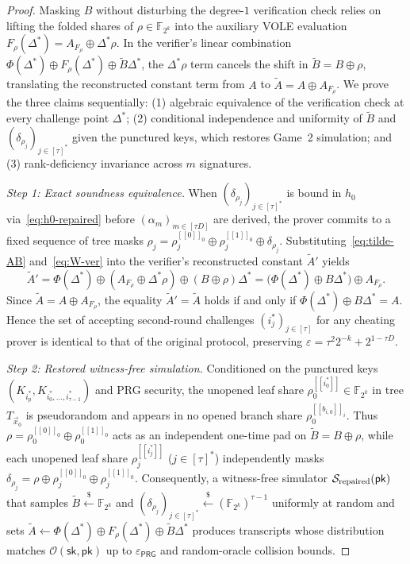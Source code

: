 \documentclass[11pt,a4paper]{article}
\theoremstyle{definition}
\theoremstyle{remark}
\newcommand{\Ftwok}{\mathbb{F}_{2^k}}
\newcommand{\pk}{\mathsf{pk}}
\newcommand{\sk}{\mathsf{sk}}
\newcommand{\PRG}{\mathsf{PRG}}
\newcommand{\share}[1]{[\![#1]\!]}
\begin{document}
\begin{proof}
Masking $B$ without disturbing the degree-$1$ verification check relies on lifting the folded shares of $\rho \in \Ftwok$ into the auxiliary VOLE evaluation $F_\rho(\Delta^*) = A_{F_\rho} \oplus \Delta^*\rho$. In the verifier's linear combination $\Phi(\Delta^*) \oplus F_\rho(\Delta^*) \oplus \tilde{B}\Delta^*$, the $\Delta^*\rho$ term cancels the shift in $\tilde{B} = B \oplus \rho$, translating the reconstructed constant term from $A$ to $\tilde{A} = A \oplus A_{F_\rho}$. We prove the three claims sequentially: (1) algebraic equivalence of the verification check at every challenge point $\Delta^*$; (2) conditional independence and uniformity of $\tilde{B}$ and $(\delta_{\rho_j})_{j \in [\tau]^*}$ given the punctured keys, which restores Game~2 simulation; and (3) rank-deficiency invariance across $m$ signatures.

\smallskip\noindent
\emph{Step 1: Exact soundness equivalence.}
When $(\delta_{\rho_j})_{j \in [\tau]^*}$ is bound in $h_0$ via~\eqref{eq:h0-repaired} before $(\alpha_m)_{m \in [\tau D]}$ are derived, the prover commits to a fixed sequence of tree masks $\rho_j = \rho_j^{\share{0}_0} \oplus \rho_j^{\share{1}_0} \oplus \delta_{\rho_j}$. Substituting~\eqref{eq:tilde-AB} and~\eqref{eq:W-ver} into the verifier's reconstructed constant $\tilde{A}'$ yields
\[
\tilde{A}' = \Phi(\Delta^*) \oplus (A_{F_\rho} \oplus \Delta^* \rho) \oplus (B \oplus \rho)\Delta^*
           = \big(\Phi(\Delta^*) \oplus B\Delta^*\big) \oplus A_{F_\rho}.
\]
Since $\tilde{A} = A \oplus A_{F_\rho}$, the equality $\tilde{A}' = \tilde{A}$ holds if and only if $\Phi(\Delta^*) \oplus B\Delta^* = A$. Hence the set of accepting second-round challenges $(i^*_j)_{j \in [\tau]}$ for any cheating prover is identical to that of the original protocol, preserving $\varepsilon = \tau^2 2^{-k} + 2^{1 - \tau D}$.

\smallskip\noindent
\emph{Step 2: Restored witness-free simulation.}
Conditioned on the punctured keys $(K_{i^*_{\text{p}}}, K_{i^*_0, \dots, i^*_{\tau-1}})$ and PRG security, the unopened leaf share $\rho_0^{\share{i^*_0}} \in \Ftwok$ in tree $T_{\vec{x}_0}$ is pseudorandom and appears in no opened branch share $\rho_0^{\share{b_{i,0}}_i}$. Thus $\rho = \rho_0^{\share{0}_0} \oplus \rho_0^{\share{1}_0}$ acts as an independent one-time pad on $\tilde{B} = B \oplus \rho$, while each unopened leaf share $\rho_j^{\share{i^*_j}}$ ($j \in [\tau]^*$) independently masks $\delta_{\rho_j} = \rho \oplus \rho_j^{\share{0}_0} \oplus \rho_j^{\share{1}_0}$. Consequently, a witness-free simulator $\mathcal{S}_{\textup{repaired}}(\pk)$ that samples $\tilde{B} \xleftarrow{\$} \Ftwok$ and $(\delta_{\rho_j})_{j \in [\tau]^*} \xleftarrow{\$} (\Ftwok)^{\tau-1}$ uniformly at random and sets $\tilde{A} \leftarrow \Phi(\Delta^*) \oplus F_\rho(\Delta^*) \oplus \tilde{B}\Delta^*$ produces transcripts whose distribution matches $\mathcal{O}(\sk, \pk)$ up to $\varepsilon_{\PRG}$ and random-oracle collision bounds.


\end{proof}
\end{document}
